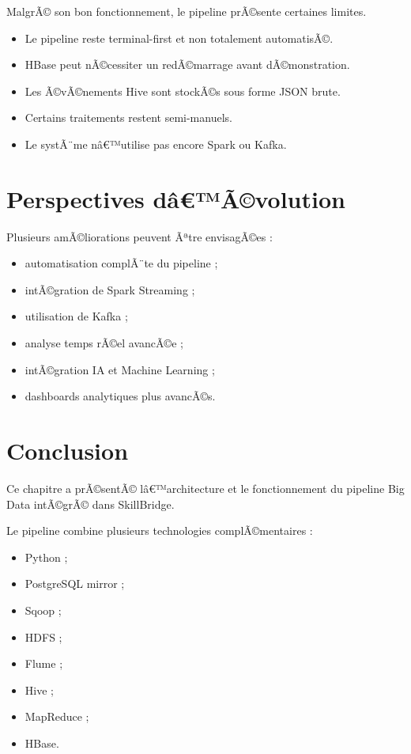 ﻿\documentclass[12pt,a4paper]{report}
\begin{document}
MalgrÃ© son bon fonctionnement, le pipeline prÃ©sente certaines limites.

\begin{itemize}
    \item Le pipeline reste terminal-first et non totalement automatisÃ©.
    
    \item HBase peut nÃ©cessiter un redÃ©marrage avant dÃ©monstration.
    
    \item Les Ã©vÃ©nements Hive sont stockÃ©s sous forme JSON brute.
    
    \item Certains traitements restent semi-manuels.
    
    \item Le systÃ¨me nâ€™utilise pas encore Spark ou Kafka.
\end{itemize}

\section{Perspectives dâ€™Ã©volution}

Plusieurs amÃ©liorations peuvent Ãªtre envisagÃ©es :

\begin{itemize}
    \item automatisation complÃ¨te du pipeline ;
    
    \item intÃ©gration de Spark Streaming ;
    
    \item utilisation de Kafka ;
    
    \item analyse temps rÃ©el avancÃ©e ;
    
    \item intÃ©gration IA et Machine Learning ;
    
    \item dashboards analytiques plus avancÃ©s.
\end{itemize}

\section{Conclusion}

Ce chapitre a prÃ©sentÃ© lâ€™architecture et le fonctionnement du pipeline Big Data intÃ©grÃ© dans SkillBridge.

Le pipeline combine plusieurs technologies complÃ©mentaires :
\begin{itemize}
    \item Python ;
    \item PostgreSQL mirror ;
    \item Sqoop ;
    \item HDFS ;
    \item Flume ;
    \item Hive ;
    \item MapReduce ;
    \item HBase.
\end{itemize}
\end{document}
